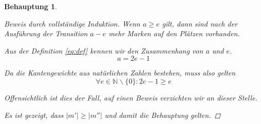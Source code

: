 \documentclass[a4paper]{scrartcl}
\newtheorem*{behaupt}{Behauptung}
\begin{document}
\begin{enumerate}
\begin{enumerate}[(a)]
\begin{behaupt}
\begin{proof}[Beweis durch vollständige Induktion]
                        Wenn $a \geq e$ gilt, dann sind nach der Ausführung
                        der Transition $a - e$ mehr Marken auf den
                        Plätzen vorhanden.

                        Aus der Definition \eqref{eq:def} kennen wir den
                        Zusammenhang von $a$ und $e$.
                        \begin{equation}
                            a = 2e-1
                        \end{equation}

                        Da die Kantengewichte aus natürlichen Zahlen bestehen,
                        muss also gelten
                        \begin{equation}
                            \forall e \in \mathbb{N} \backslash \{0\} : 2e-1 \geq e
                        \end{equation}

                        Offensichtlich ist dies der Fall, auf einen Beweis
                        verzichten wir an dieser Stelle.
                        
                        Es ist gezeigt, dass $|m'| \geq |m''|$ und damit die
                        Behauptung gelten.
                    \end{proof}
                \end{behaupt}

        \end{enumerate}

\end{enumerate}
\end{document}
